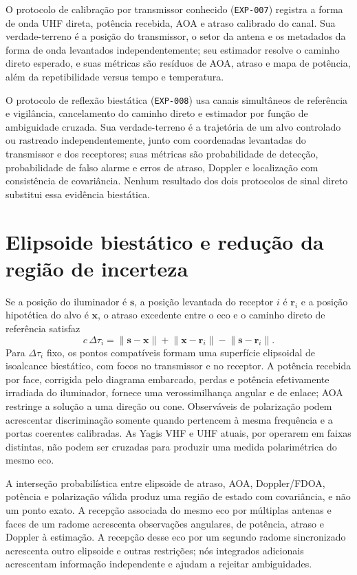 O protocolo de calibração por transmissor conhecido (\texttt{EXP-007}) registra a forma de onda UHF direta, potência recebida, AOA e atraso calibrado do canal. Sua verdade-terreno é a posição do transmissor, o setor da antena e os metadados da forma de onda levantados independentemente; seu estimador resolve o caminho direto esperado, e suas métricas são resíduos de AOA, atraso e mapa de potência, além da repetibilidade versus tempo e temperatura.

O protocolo de reflexão biestática (\texttt{EXP-008}) usa canais simultâneos de referência e vigilância, cancelamento do caminho direto e estimador por função de ambiguidade cruzada. Sua verdade-terreno é a trajetória de um alvo controlado ou rastreado independentemente, junto com coordenadas levantadas do transmissor e dos receptores; suas métricas são probabilidade de detecção, probabilidade de falso alarme e erros de atraso, Doppler e localização com consistência de covariância. Nenhum resultado dos dois protocolos de sinal direto substitui essa evidência biestática.

\section{Elipsoide biestático e redução da região de incerteza}
Se a posição do iluminador é $\mathbf{s}$, a posição levantada do receptor $i$ é $\mathbf{r}_i$ e a posição hipotética do alvo é $\mathbf{x}$, o atraso excedente entre o eco e o caminho direto de referência satisfaz
\[
c\,\Delta\tau_i=
\lVert\mathbf{s}-\mathbf{x}\rVert+
\lVert\mathbf{x}-\mathbf{r}_i\rVert-
\lVert\mathbf{s}-\mathbf{r}_i\rVert.
\]
Para $\Delta\tau_i$ fixo, os pontos compatíveis formam uma superfície elipsoidal de isoalcance biestático, com focos no transmissor e no receptor. A potência recebida por face, corrigida pelo diagrama embarcado, perdas e potência efetivamente irradiada do iluminador, fornece uma verossimilhança angular e de enlace; AOA restringe a solução a uma direção ou cone. Observáveis de polarização podem acrescentar discriminação somente quando pertencem à mesma frequência e a portas coerentes calibradas. As Yagis VHF e UHF atuais, por operarem em faixas distintas, não podem ser cruzadas para produzir uma medida polarimétrica do mesmo eco.

A interseção probabilística entre elipsoide de atraso, AOA, Doppler/FDOA, potência e polarização válida produz uma região de estado com covariância, e não um ponto exato. A recepção associada do mesmo eco por múltiplas antenas e faces de um radome acrescenta observações angulares, de potência, atraso e Doppler à estimação. A recepção desse eco por um segundo radome sincronizado acrescenta outro elipsoide e outras restrições; nós integrados adicionais acrescentam informação independente e ajudam a rejeitar ambiguidades.

